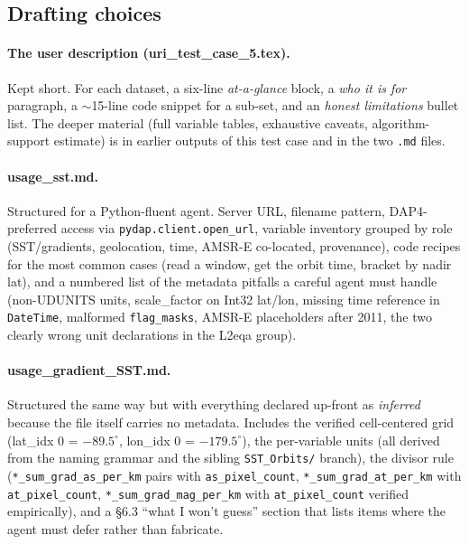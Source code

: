 \documentclass[11pt]{article}
\begin{document}
\subsection{Drafting choices}

\paragraph{The user description (uri\_test\_case\_5.tex).}
Kept short. For each dataset, a six-line \emph{at-a-glance} block,
a \emph{who it is for} paragraph, a $\sim$15-line code snippet for
a sub-set, and an \emph{honest limitations} bullet list. The
deeper material (full variable tables, exhaustive caveats,
algorithm-support estimate) is in earlier outputs of this test
case and in the two \texttt{.md} files.

\paragraph{usage\_sst.md.} Structured for a Python-fluent agent.
Server URL, filename pattern, DAP4-preferred access via
\texttt{pydap.client.open\_url}, variable inventory grouped by
role (SST/gradients, geolocation, time, AMSR-E co-located,
provenance), code recipes for the most common cases (read a
window, get the orbit time, bracket by nadir lat), and a numbered
list of the metadata pitfalls a careful agent must handle
(non-UDUNITS units, scale\_factor on Int32 lat/lon, missing time
reference in \texttt{DateTime}, malformed \texttt{flag\_masks},
AMSR-E placeholders after 2011, the two clearly wrong unit
declarations in the L2eqa group).

\paragraph{usage\_gradient\_SST.md.} Structured the same way but
with everything declared up-front as \emph{inferred} because the
file itself carries no metadata. Includes the verified
cell-centered grid (lat\_idx 0 = $-89.5^\circ$, lon\_idx 0 =
$-179.5^\circ$), the per-variable units (all derived from the
naming grammar and the sibling \texttt{SST\_Orbits/} branch), the
divisor rule (\texttt{*\_sum\_grad\_as\_per\_km} pairs with
\texttt{as\_pixel\_count}, \texttt{*\_sum\_grad\_at\_per\_km} with
\texttt{at\_pixel\_count}, \texttt{*\_sum\_grad\_mag\_per\_km}
with \texttt{at\_pixel\_count} verified empirically), and a
\S6.3 ``what I won't guess'' section that lists items where the
agent must defer rather than fabricate.
\end{document}
